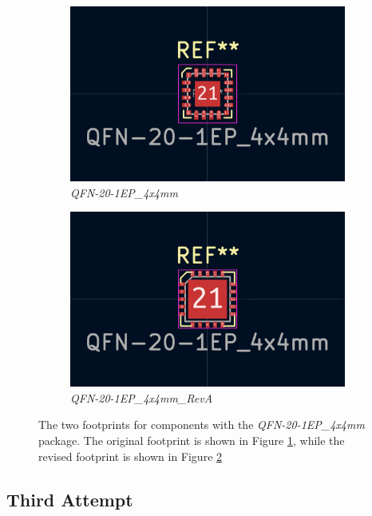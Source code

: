 \begin{figure}[t]
  \centering
  \begin{subfigure}{.5\textwidth}
    \centering
    \includegraphics[width=.8\linewidth]{Figures/kicad/QFN-20-1EP_4x4mm}
    \caption{\emph{QFN-20-1EP\_4x4mm}}
    \label{fig:FootprintQFN204x4_Original}
  \end{subfigure}%
  \begin{subfigure}{.5\textwidth}
    \centering
    \includegraphics[width=.8\linewidth]{Figures/kicad/QFN-20-1EP_4x4mm_RevA}
    \caption{\emph{QFN-20-1EP\_4x4mm\_RevA}}
    \label{fig:FootprintQFN204x4_RevA}
  \end{subfigure}
  \caption[Two versions of the QFN-20-1EP\_4x4mm package]{The two footprints for components with the \emph{QFN-20-1EP\_4x4mm} package. The original footprint is shown in Figure \ref{fig:FootprintQFN204x4_Original}, while the revised footprint is shown in Figure \ref{fig:FootprintQFN204x4_RevA}}
  \label{fig:FootprintQFN204x4}
\end{figure}

\subsection{Third Attempt}\label{subsec:Manufacturing3}

